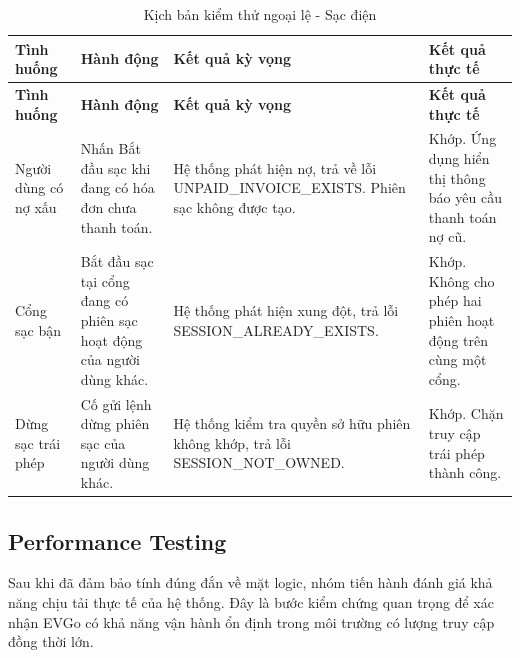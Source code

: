 \begin{center}
    \renewcommand{\arraystretch}{1.5}
    \begin{longtable}{|>{\raggedright\arraybackslash}m{}|>{\raggedright\arraybackslash}m{}|>{\raggedright\arraybackslash}m{}|>{\raggedright\arraybackslash}m{}|}
        \caption{Kịch bản kiểm thử ngoại lệ - Sạc điện}
        \label{tab:charging_negative} \\
        \hline
        \textbf{Tình huống} & \textbf{Hành động} & \textbf{Kết quả kỳ vọng} & \textbf{Kết quả thực tế} \\
        \hline
        \endfirsthead
        
        \hline
        \textbf{Tình huống} & \textbf{Hành động} & \textbf{Kết quả kỳ vọng} & \textbf{Kết quả thực tế} \\
        \hline
        \endhead
        
        Người dùng có nợ xấu & Nhấn Bắt đầu sạc khi đang có hóa đơn chưa thanh toán. & Hệ thống phát hiện nợ, trả về lỗi UNPAID\_\allowbreak INVOICE\_\allowbreak EXISTS. Phiên sạc không được tạo. & Khớp. Ứng dụng hiển thị thông báo yêu cầu thanh toán nợ cũ. \\
        \hline
        Cổng sạc bận & Bắt đầu sạc tại cổng đang có phiên sạc hoạt động của người dùng khác. & Hệ thống phát hiện xung đột, trả lỗi SESSION\_\allowbreak ALREADY\_\allowbreak EXISTS. & Khớp. Không cho phép hai phiên hoạt động trên cùng một cổng. \\
        \hline
        Dừng sạc trái phép & Cố gửi lệnh dừng phiên sạc của người dùng khác. & Hệ thống kiểm tra quyền sở hữu phiên không khớp, trả lỗi SESSION\_\allowbreak NOT\_\allowbreak OWNED. & Khớp. Chặn truy cập trái phép thành công. \\
        \hline
    \end{longtable}
\end{center}


\subsection{Performance Testing}

\hspace*{\parindent}
Sau khi đã đảm bảo tính đúng đắn về mặt logic, nhóm tiến hành đánh giá khả năng
chịu tải thực tế của hệ thống. Đây là bước kiểm chứng quan trọng để xác nhận EVGo
có khả năng vận hành ổn định trong môi trường có lượng truy cập đồng thời lớn.

